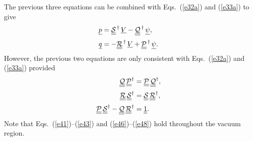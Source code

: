 \documentclass[12pt,prb,aps,notitlepage]{revtex4-1}
\begin{document}
The previous three equations can be combined with Eqs.~(\ref{e32a}) and (\ref{e33a}) to give 
\begin{align}
\underline{p} &= \underline{\underline{\cal S}}^{\,\dag} \,\underline{V} - \underline{\underline{\cal Q}}^{\,\dag}\,\underline{\psi},\\[0.5ex]
\underline{q} &= -\underline{\underline{\cal R}}^{\,\dag} \,\underline{V} + \underline{\underline{\cal P}}^{\,\dag}\,\underline{\psi}.
\end{align}
However, the previous two equations are only consistent with Eqs.~(\ref{e32a}) and (\ref{e33a}) provided 
\begin{align}\label{e46}
\underline{\underline{\cal Q}}\,\underline{\underline{\cal P}}^\dag&= \underline{\underline{\cal P}}\,\underline{\underline{\cal Q}}^\dag,\\[0.5ex]
\underline{\underline{\cal R}}\,\underline{\underline{\cal S}}^\dag&= \underline{\underline{\cal S}}\,\underline{\underline{\cal R}}^\dag,\label{e47}\\[0.5ex]
\underline{\underline{\cal P}}\,\underline{\underline{\cal S}}^{\dag}- \underline{\underline{\cal Q}}\,\underline{\underline{\cal R}}^{\dag}&=\underline{\underline{1}}.\label{e48}
\end{align}
Note that Eqs.~(\ref{e41})--(\ref{e43}) and (\ref{e46})--(\ref{e48}) hold throughout the vacuum region. 
\end{document}
